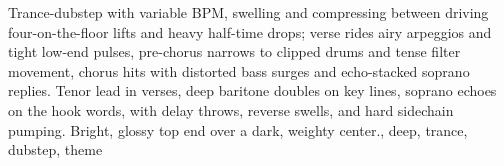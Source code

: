 

\begin{notes}
\end{notes}
\begin{style}
Trance-dubstep with variable BPM, swelling and compressing between driving four-on-the-floor lifts and heavy half-time drops; verse rides airy arpeggios and tight low-end pulses, pre-chorus narrows to clipped drums and tense filter movement, chorus hits with distorted bass surges and echo-stacked soprano replies. %
Tenor lead in verses, deep baritone doubles on key lines, soprano echoes on the hook words, with delay throws, reverse swells, and hard sidechain pumping. %
Bright, glossy top end over a dark, weighty center., deep, trance, dubstep, theme
\end{style}
